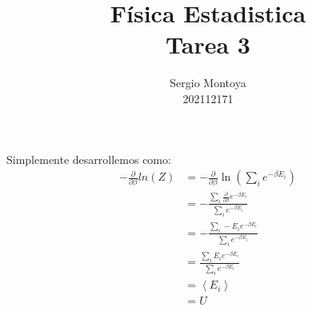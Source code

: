 \documentclass{report}
\title{\Huge{Física Estadistica}\\Tarea 3}
\author{\huge{Sergio Montoya} \\ 202112171}
\date{}
\begin{document}
\maketitle
\newpage%
\tableofcontents
\pagebreak

\chapter{}

\section{}
Simplemente desarrollemos como:
\begin{align*}
	- \frac{\partial}{\partial \beta} ln \left( Z \right)&= - \frac{\partial}{\partial \beta} \ln \left( \sum_{i} e^{-\beta E_i} \right)\\
	&= - \frac{\sum_{i} \frac{\partial}{\partial \beta} e^{-\beta E_i}}{\sum_{i} e^{-\beta E_i}}\\
	&= - \frac{\sum_{i} - E_i e^{-\beta E_i}}{\sum_{i} e^{-\beta E_i}}\\
	&= \frac{\sum_{i} E_i e^{-\beta E_i}}{\sum_{i} e^{-\beta E_i}}\\
	&= \left< E_i \right>\\
	&= U
\end{align*}

\section{}
\end{document}

